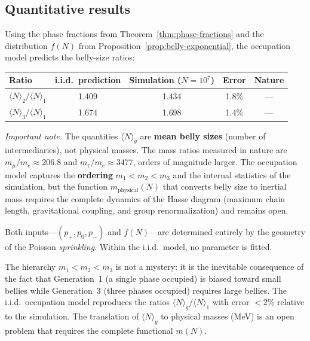 \subsection{Quantitative results}

Using the phase fractions from
Theorem~\ref{thm:phase-fractions} and the distribution $f(N)$ from
Proposition~\ref{prop:belly-exponential}, the occupation model
predicts the belly-size ratios:

\medskip
\begin{center}
\small
\begin{tabular}{lcccc}
\toprule
\textbf{Ratio} & \textbf{i.i.d.\ prediction}
  & \textbf{Simulation ($N\!=\!10^7$)}
  & \textbf{Error} & \textbf{Nature} \\
\midrule
$\langle N\rangle_2 / \langle N\rangle_1$
  & 1{.}409 & 1{.}434 & 1{.}8\% & --- \\
$\langle N\rangle_3 / \langle N\rangle_1$
  & 1{.}674 & 1{.}698 & 1{.}4\% & --- \\
\bottomrule
\end{tabular}
\end{center}
\medskip

\noindent\textit{Important note.}\enspace
The quantities $\langle N\rangle_g$ are \textbf{mean belly
sizes} (number of intermediaries), not physical masses. The
mass ratios measured in nature are
$m_\mu / m_e \approx 206{.}8$ and $m_\tau / m_e \approx 3477$,
orders of magnitude larger. The occupation model captures the
\textbf{ordering} $m_1 < m_2 < m_3$ and the internal statistics
of the simulation, but the function $m_{\text{physical}}(N)$ that
converts belly size to inertial mass requires the
complete dynamics of the Hasse diagram (maximum chain length,
gravitational coupling, and group renormalization) and remains
open.

\medskip
Both inputs---$(p_+, p_0, p_-)$ and $f(N)$---are determined
entirely by the geometry of the Poisson \emph{sprinkling}.
Within the i.i.d.\ model, no parameter is fitted.

\begin{result}[title={The mass hierarchy is an occupation effect}]
\label{res:mass-hierarchy-occupancy}
The hierarchy $m_1 < m_2 < m_3$ is not a mystery: it is the
inevitable consequence of the fact that Generation~1 (a single phase
occupied) is biased toward small bellies while
Generation~3 (three phases occupied) requires large bellies. The
i.i.d.\ occupation model reproduces the ratios
$\langle N\rangle_g / \langle N\rangle_1$ with error $< 2\%$
relative to the simulation. The translation of $\langle N\rangle_g$
to physical masses (MeV) is an open problem that requires the
complete functional $m(N)$.
\end{result}

